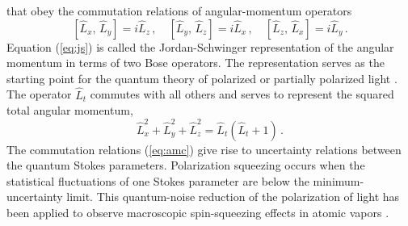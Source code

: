 \documentclass[12pt,amsmath,amssymb]{article}
\numberwithin{equation}{section}
\begin{document}
that obey the commutation relations of angular-momentum operators
\begin{equation}
\label{eq:amc} [\hat{L}_x,\,\hat{L}_y]=i\hat{L}_z \,,\quad
[\hat{L}_y,\,\hat{L}_z]=i\hat{L}_x \,,\quad
[\hat{L}_z,\,\hat{L}_x]=i\hat{L}_y \,.
\end{equation}
Equation (\ref{eq:js}) is called the Jordan-Schwinger
representation \cite{Jordan,Schwinger} of the angular momentum in
terms of two Bose operators. The representation serves as the
starting point for the quantum theory of polarized or partially
polarized light \cite{Korolkova,Lehner}. The operator $\hat{L}_t$
commutes with all others and serves to represent
the squared total angular momentum,
\begin{equation}
\label{eq:totall} \hat{L}_x^2 + \hat{L}_y^2 + \hat{L}_z^2 =
\hat{L}_t(\hat{L}_t + 1) \,.
\end{equation}
The commutation
relations (\ref{eq:amc}) give rise to uncertainty relations
between the quantum Stokes parameters. Polarization squeezing
\cite{Heersink} occurs when the statistical fluctuations of one
Stokes parameter are below the minimum-uncertainty limit.
This quantum-noise reduction of the polarization of light
has been applied to
observe macroscopic spin-squeezing effects in atomic vapors
\cite{Hald,Julsgaard}.
\end{document}
